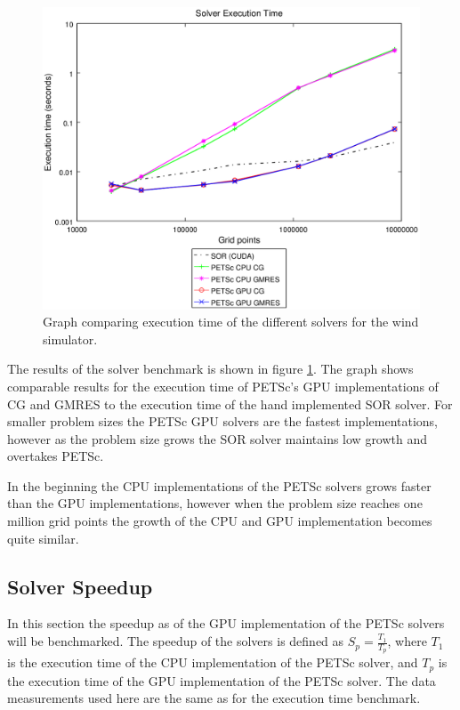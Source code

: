 \begin{figure}[ht]
	\center
	\includegraphics[width=1.0\textwidth]{results/data/sb/exec_time_all}
	\caption{Graph comparing execution time of the different solvers for the
		wind simulator.}
	\label{fig:sb_exec_time_all}
\end{figure}

The results of the solver benchmark is shown in figure \ref{fig:sb_exec_time_all}.
The graph shows comparable results for the execution time of PETSc's GPU
implementations of CG and GMRES to the execution time of the hand implemented
SOR solver. For smaller problem sizes the PETSc GPU solvers are the fastest
implementations, however as the problem size grows the SOR solver maintains
low growth and overtakes PETSc.

In the beginning the CPU implementations of the
PETSc solvers grows faster than the GPU implementations, however when the
problem size reaches one million grid points the growth of the CPU and GPU
implementation becomes quite similar.

\subsection{Solver Speedup}

In this section the speedup as of the GPU implementation of the PETSc solvers will
be benchmarked. The speedup of the solvers is defined as $S_p = \frac{T_1}{T_p}$,
where $T_1$ is the execution time of the CPU implementation of the PETSc solver,
and $T_p$ is the execution time of the GPU implementation of the PETSc solver.
The data measurements used here are the same as for the execution time benchmark.

